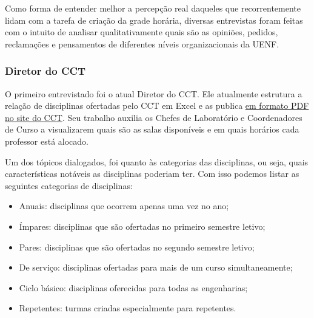 
    Como forma de entender melhor a percepção real daqueles que recorrentemente lidam com a tarefa de criação da grade horária, diversas entrevistas foram feitas com o intuito de analisar qualitativamente quais são as opiniões, pedidos, reclamações e pensamentos de diferentes níveis organizacionais da UENF.

    \subsubsection{Diretor do CCT} %


        O primeiro entrevistado foi o atual Diretor do CCT. Ele atualmente estrutura a relação de disciplinas ofertadas pelo CCT em Excel e as publica \href{https://uenf.br/cct/secretaria-academica/distribuicao-das-salas-de-aula-do-cct/}{em formato PDF no site do CCT}. Seu trabalho auxilia os Chefes de Laboratório e Coordenadores de Curso a visualizarem quais são as salas disponíveis e em quais horários cada professor está alocado.

        Um dos tópicos dialogados, foi quanto às categorias das disciplinas, ou seja, quais características notáveis as disciplinas poderiam ter. Com isso podemos listar as seguintes categorias de disciplinas:

        \begin{itemize}
            \item Anuais: disciplinas que ocorrem apenas uma vez no ano;
            \item Ímpares: disciplinas que são ofertadas no primeiro semestre letivo;
            \item Pares: disciplinas que são ofertadas no segundo semestre letivo;
            \item De serviço: disciplinas ofertadas para mais de um curso simultaneamente;
            \item Ciclo básico: disciplinas oferecidas para todas as engenharias;
            \item Repetentes: turmas criadas especialmente para repetentes.
        \end{itemize}



